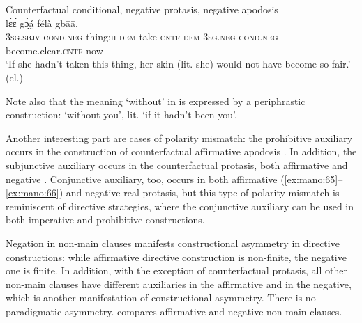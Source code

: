 \documentclass[output=paper,colorlinks,citecolor=brown]{langscibook}
\begin{document}
\ea\label{ex:mano:70}Counterfactual conditional, negative protasis, negative apodosis\\
    \gll [è gɔ̰̀á̰ pɛ́ ɓɛ̄ sí-à ā] lɛ̀ɛ́ gɔ̰̀á̰ félà gbāā. \\
         \textsc{3sg.sbjv} \textsc{cond.neg} thing:\textsc{h} \textsc{dem} take-\textsc{cntf} \textsc{dem} \textsc{3sg.neg} \textsc{cond.neg} become.clear.\textsc{cntf} now    \\ 
    \glt ‘If she hadn’t taken this thing, her skin (lit. she) would not have become so fair.’ (el.)
\z


Note also that the meaning ‘without’ in  is expressed by a periphrastic construction: ‘without you’, lit. ‘if it hadn’t been you’.

Another interesting part are cases of polarity mismatch: the prohibitive auxiliary occurs in the construction of counterfactual affirmative apodosis . In addition, the subjunctive auxiliary occurs in the counterfactual protasis, both affirmative  and negative . Conjunctive auxiliary, too, occurs in both affirmative (\ref{ex:mano:65}--\ref{ex:mano:66}) and negative  real protasis, but this type of polarity mismatch is reminiscent of directive strategies, where the conjunctive auxiliary can be used in both imperative and prohibitive constructions. 

\largerpage[4]
Negation in non-main clauses manifests constructional asymmetry in directive constructions: while affirmative directive construction is non-finite, the negative one is finite. In addition, with the exception of counterfactual protasis, all other non-main clauses have different auxiliaries in the affirmative and in the negative, which is another manifestation of constructional asymmetry. There is no paradigmatic asymmetry.
 compares affirmative and negative non-main clauses. 
\end{document}
